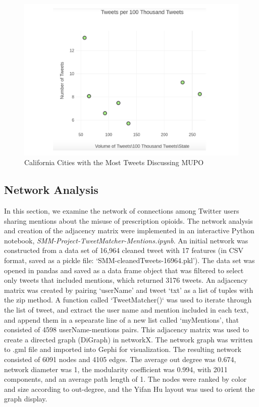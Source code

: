 \documentclass[sigconf]{acmart}
\begin{document}
\begin{figure}[!ht]
  \centering\includegraphics[width=\columnwidth]{images/Figure6.pdf}
  \caption{California Cities with the Most Tweets Discussing MUPO}
  \label{f:Figure6}
\end{figure}
\subsection{Network Analysis} 

In this section, we examine the network of connections among Twitter users 
sharing mentions about the misuse of prescription opioids. The network analysis 
and creation of the adjacency matrix were implemented in an interactive Python 
notebook, \emph{SMM-Project-TweetMatcher-Mentions.ipynb}. An initial network 
was constructed from a data set of 16,964 cleaned tweet with 17 features
(in CSV format, saved as a pickle file: `SMM-cleanedTweets-16964.pkl'). The 
data set was opened in pandas and saved as a data frame object that was 
filtered to select only tweets that included mentions, which returned 3176 
tweets. An adjacency matrix was created by pairing `userName' and tweet `txt' 
as a list of tuples with the zip method. A function called `TweetMatcher()` 
was used to iterate through the list of tweet, and extract the user name and 
mention included in each text, and append them in a sepearate line of a new 
list called ‘myMentions’, that consisted of 4598 userName-mentions pairs. 
This adjacency matrix was used to create a directed graph (DiGraph) in 
networkX. The network graph was written to .gml file and imported into 
Gephi for visualization. The resulting network consisted of 6091 nodes and 
4105 edges. The average out degree was 0.674, network diameter was 1, the 
modularity coefficient was 0.994, with 2011 components, and an average path 
length of 1. The nodes were ranked by color and size according to out-degree,
and the Yifan Hu layout was used to orient the graph display.
\end{document}
